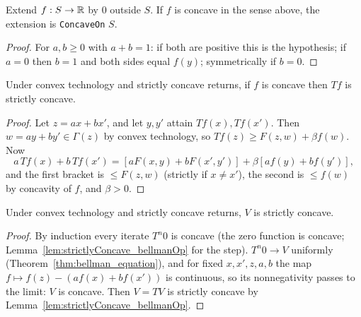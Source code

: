 \begin{lemma}
\label{lem:concaveFn_concaveOn}
\leanok
{}
Extend $f : S \to \mathbb{R}$ by $0$ outside $S$. If $f$ is concave in the sense above, the extension is
\texttt{ConcaveOn} $S$.
\end{lemma}
\begin{proof}
\leanok
For $a, b \ge 0$ with $a + b = 1$: if both are positive this is the hypothesis; if $a = 0$ then $b = 1$
and both sides equal $f(y)$; symmetrically if $b = 0$.
\end{proof}

\begin{lemma}
\label{lem:strictlyConcave_bellmanOp}
\leanok
{}
Under convex technology and strictly concave returns, if $f$ is concave then $Tf$ is strictly concave.
\end{lemma}
\begin{proof}
\leanok
Let $z = ax + bx'$, and let $y, y'$ attain $Tf(x), Tf(x')$. Then $w = ay + by' \in \Gamma(z)$ by convex
technology, so $Tf(z) \ge F(z, w) + \beta f(w)$. Now
\[
  a\,Tf(x) + b\,Tf(x') = [a F(x, y) + b F(x', y')] + \beta [a f(y) + b f(y')],
\]
and the first bracket is $\le F(z, w)$ (strictly if $x \neq x'$), the second is $\le f(w)$ by
concavity of $f$, and $\beta > 0$.
\end{proof}

\begin{theorem}
\label{thm:value_strictlyConcave}
\leanok
{}
Under convex technology and strictly concave returns, $V$ is strictly concave.
\end{theorem}
\begin{proof}
\leanok
By induction every iterate $T^n 0$ is concave (the zero function is concave;
Lemma~\ref{lem:strictlyConcave_bellmanOp} for the step). $T^n 0 \to V$ uniformly
(Theorem~\ref{thm:bellman_equation}), and for fixed $x, x', z, a, b$ the map
$f \mapsto f(z) - (a f(x) + b f(x'))$ is continuous, so its nonnegativity passes to the limit: $V$ is
concave. Then $V = TV$ is strictly concave by Lemma~\ref{lem:strictlyConcave_bellmanOp}.
\end{proof}

